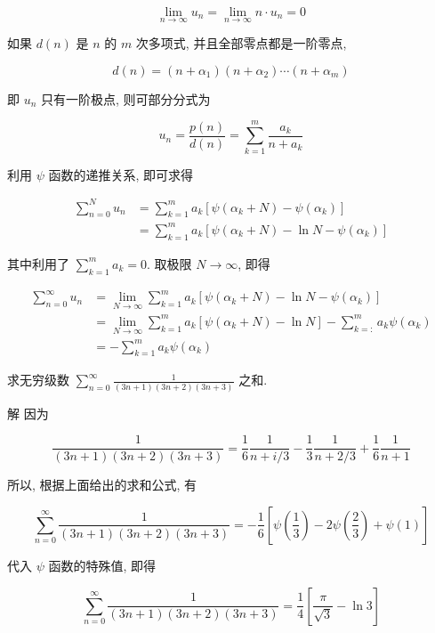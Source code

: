 $$
\lim _{n \rightarrow \infty} u_{n}=\lim _{n \rightarrow \infty} n \cdot u_{n}=0
$$

如果 $d(n)$ 是 $n$ 的 $m$ 次多项式, 并且全部零点都是一阶零点,

$$
d(n)=\left(n+\alpha_{1}\right)\left(n+\alpha_{2}\right) \cdots\left(n+\alpha_{m}\right)
$$

即 $u_{n}$ 只有一阶极点, 则可部分分式为

$$
u_{n}=\frac{p(n)}{d(n)}=\sum_{k=1}^{m} \frac{a_{k}}{n+a_{k}}
$$

利用 $\psi$ 函数的递推关系, 即可求得

$$
\begin{aligned}
\sum_{n=0}^{N} u_{n} & =\sum_{k=1}^{m} a_{k}\left[\psi\left(\alpha_{k}+N\right)-\psi\left(\alpha_{k}\right)\right] \\
& =\sum_{k=1}^{m} a_{k}\left[\psi\left(\alpha_{k}+N\right)-\ln N-\psi\left(\alpha_{k}\right)\right]
\end{aligned}
$$

其中利用了 $\sum_{k=1}^{m} a_{k}=0$. 取极限 $N \rightarrow \infty$, 即得

$$
\begin{aligned}
\sum_{n=0}^{\infty} u_{n} & =\lim _{N \rightarrow \infty} \sum_{k=1}^{m} a_{k}\left[\psi\left(\alpha_{k}+N\right)-\ln N-\psi\left(\alpha_{k}\right)\right] \\
& =\lim _{N \rightarrow \infty} \sum_{k=1}^{m} a_{k}\left[\psi\left(\alpha_{k}+N\right)-\ln N\right]-\sum_{k=:}^{m} a_{k} \psi\left(\alpha_{k}\right) \\
& =-\sum_{k=1}^{m} a_{k} \psi\left(\alpha_{k}\right)
\end{aligned}
$$

\begin{examplebox}{求无穷级数 $\sum_{n=0}^{\infty} \frac{1}{(3 n+1)(3 n+2)(3 n+3)}$ 之和.}

解 因为

$$
\frac{1}{(3 n+1)(3 n+2)(3 n+3)}=\frac{1}{6} \frac{1}{n+i / 3}-\frac{1}{3} \frac{1}{n+2 / 3}+\frac{1}{6} \frac{1}{n+1}
$$

所以, 根据上面给出的求和公式, 有

$$
\sum_{n=0}^{\infty} \frac{1}{(3 n+1)(3 n+2)(3 n+3)}=-\frac{1}{6}\left[\psi\left(\frac{1}{3}\right)-2 \psi\left(\frac{2}{3}\right)+\psi(1)\right]
$$

代入 $\psi$ 函数的特殊值, 即得

$$
\sum_{n=0}^{\infty} \frac{1}{(3 n+1)(3 n+2)(3 n+3)}=\frac{1}{4}\left[\frac{\pi}{\sqrt{3}}-\ln 3\right]
$$
\end{examplebox}

